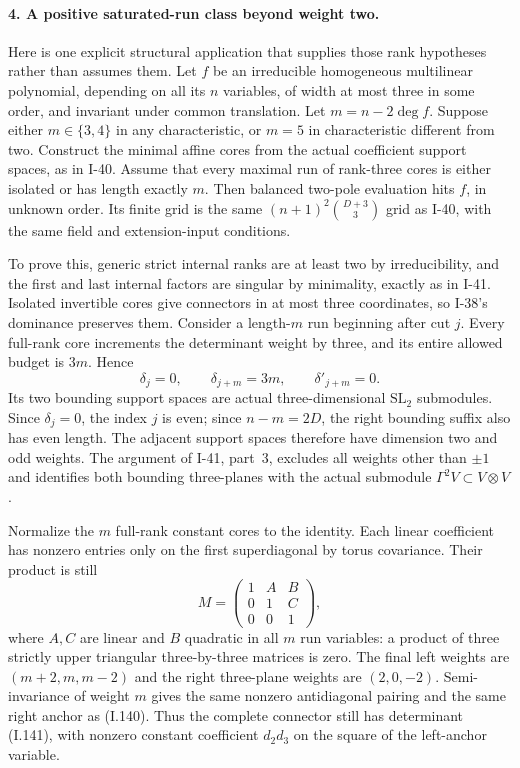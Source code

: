 \paragraph{4. A positive saturated-run class beyond weight two.}
Here is one explicit structural application that supplies those
rank hypotheses rather than assumes them. Let $f$ be an
irreducible homogeneous multilinear polynomial, depending on
all its $n$ variables, of width at most three in some order,
and invariant under common translation. Let
$m=n-2\deg f$. Suppose either $m\in\{3,4\}$ in any
characteristic, or $m=5$ in characteristic different from two.
Construct the minimal affine cores from the actual coefficient
support spaces, as in I-40. Assume that every maximal run of
rank-three cores is either isolated or has length exactly $m$.
Then balanced two-pole evaluation hits $f$, in unknown order.
Its finite grid is the same
$(n+1)^2\binom{D+3}{3}$ grid as I-40, with the same field
and extension-input conditions.

To prove this, generic strict internal ranks are at least two
by irreducibility, and the first and last internal factors
are singular by minimality, exactly as in I-41. Isolated
invertible cores give connectors in at most three coordinates,
so I-38's dominance preserves them. Consider a length-$m$
run beginning after cut $j$. Every full-rank core increments
the determinant weight by three, and its entire allowed
budget is $3m$. Hence
\[
 \delta_j=0,\qquad\delta_{j+m}=3m,
 \qquad\delta'_{j+m}=0.
 \tag{I.154}
\]
Its two bounding support spaces are actual three-dimensional
$\mathrm{SL}_2$ submodules. Since $\delta_j=0$, the index
$j$ is even; since $n-m=2D$, the right bounding suffix also
has even length. The adjacent support spaces therefore have
dimension two and odd weights. The argument of I-41,
part~3, excludes all weights other than $\pm1$ and identifies
both bounding three-planes with the actual submodule
$\Gamma^2V\subset V\otimes V$.

Normalize the $m$ full-rank constant cores to the identity.
Each linear coefficient has nonzero entries only on the first
superdiagonal by torus covariance. Their product is still
\[
 M=\begin{pmatrix}1&A&B\\0&1&C\\0&0&1\end{pmatrix},
 \tag{I.155}
\]
where $A,C$ are linear and $B$ quadratic in all $m$ run
variables: a product of three strictly upper triangular
three-by-three matrices is zero. The final left weights are
$(m+2,m,m-2)$ and the right three-plane weights are
$(2,0,-2)$. Semi-invariance of weight $m$ gives the same
nonzero antidiagonal pairing and the same right anchor
as (I.140). Thus the complete connector still has determinant
(I.141), with nonzero constant coefficient $d_2d_3$ on the
square of the left-anchor variable.

